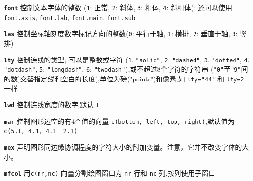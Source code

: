 \documentclass[landscape]{article}
\newcommand{\code}{\texttt}
\newcommand{\bcode}[1]{\texttt{\textbf{#1}}}
\begin{document}
\begin{multicols*}{3}
\bcode{font}  控制文本字体的整数 (\code{1}: 正常, \code{2}: 斜体, \code{3}: 粗体, \code{4}: 斜粗体);
还可以使用 \code{font.axis}, \code{font.lab}, \code{font.main}, \code{font.sub}

\bcode{las}  控制坐标轴刻度数字标记方向的整数(\code{0}: 平行于轴, \code{1}: 横排, \code{2}: 垂直于轴, \code{3}: 竖排)

\bcode{lty}  控制连线的类型,
可以是整数或字符 (\code{1}: \code{"solid"}, \code{2}: \code{"dashed"}, \code{3}: \code{"dotted"},
\code{4}: \code{"dotdash"}, \code{5}: \code{"longdash"}, \code{6}: \code{"twodash"}),或不超过8个字符的字符串
(\code{"0"}至\code{"9"}间的数)交替指定线和空白的长度),单位为磅("points")和像素,如 \code{lty="44"} 和 \code{lty=2} 一样

\bcode{lwd}  控制连线宽度的数字,默认 \code{1}

\bcode{mar}  控制图形边空的有4个值的向量 \code{c(bottom, left, top, right)},默认值为 \code{c(5.1, 4.1, 4.1, 2.1)}

\bcode{mex} 声明图形同边缘协调程度的字符大小的附加变量。注意，它并不改变字体的大小。

\bcode{mfcol}   用\code{c(nr,nc)} 向量分割绘图窗口为 \code{nr} 行和  \code{nc} 列,按列使用子窗口


\end{multicols*}
\end{document}
